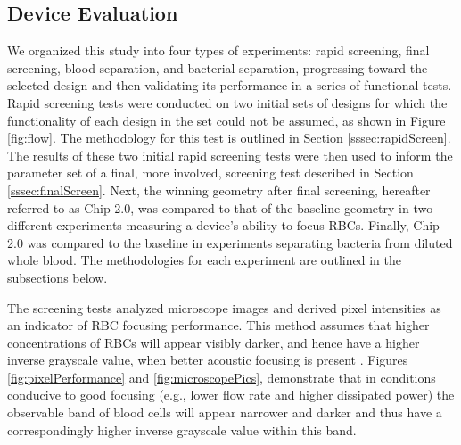 \subsection{Device Evaluation}
\label{sec:eval}
We organized this study into four types of experiments: rapid screening, final screening, blood separation, and bacterial separation, progressing toward the selected design and then validating its performance in a series of functional tests. Rapid screening tests were conducted on two initial sets of designs for which the functionality of each design in the set could not be assumed, as shown in Figure \ref{fig:flow}. The methodology for this test is outlined in Section \ref{sssec:rapidScreen}. The results of these two initial rapid screening tests were then used to inform the parameter set of a final, more involved, screening test described in Section \ref{sssec:finalScreen}. Next, the winning geometry after final screening, hereafter referred to as Chip 2.0,  was compared to that of the baseline geometry in two different experiments measuring a device's ability to focus RBCs.  Finally, Chip 2.0 was compared to the baseline in experiments separating bacteria from diluted whole blood. The methodologies for each experiment are outlined in the subsections below. 

The screening tests analyzed microscope images and derived pixel intensities as an indicator of RBC focusing performance. This method assumes that higher concentrations of RBCs will appear visibly darker, and hence have a higher inverse grayscale value, when better acoustic focusing is present \cite{barnkob2012measuring}. Figures \ref{fig:pixelPerformance} and \ref{fig:microscopePics},  demonstrate that in conditions conducive to good focusing (e.g., lower flow rate and higher dissipated power) the observable band of blood cells will appear narrower and darker and thus have a correspondingly higher inverse grayscale value within this band. 

